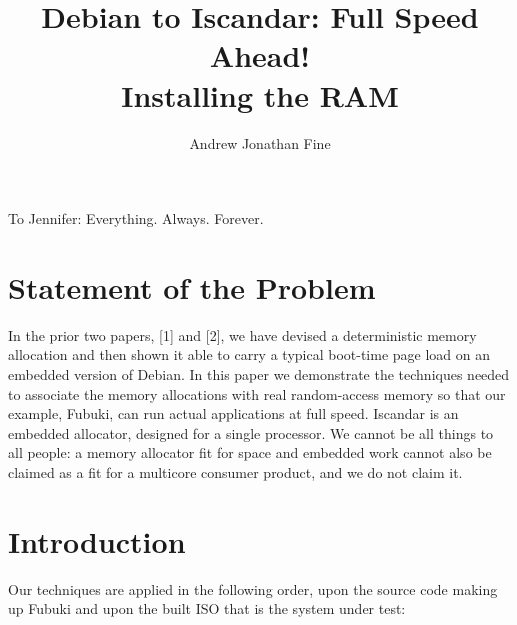 \documentclass[11pt]{article}
\title{Debian to Iscandar: Full Speed Ahead!\\[0.6em] \large Installing the RAM}
\author{Andrew Jonathan Fine}
\date{}
\begin{document}
\maketitle

\thispagestyle{empty}
\newpage

\vspace*{\fill}
\begin{center}
To Jennifer: Everything. Always. Forever.
\end{center}
\vspace*{\fill}

\newpage


\begin{abstract}
\end{abstract}

\section*{Statement of the Problem}
In the prior two papers, [1] and [2], we have devised a deterministic memory allocation and then shown it able to carry a typical boot-time page load on an embedded version of Debian. In this paper we demonstrate the techniques needed to associate the memory allocations with real random-access memory so that our example, Fubuki, can run actual applications at full speed. Iscandar is an embedded allocator, designed for a single processor. We cannot be all things to all people: a memory allocator fit for space and embedded work cannot also be claimed as a fit for a multicore consumer product, and we do not claim it.

\section{Introduction}

Our techniques are applied in the following order, upon the source
code making up Fubuki and upon the built ISO that is the system
under test:
\end{document}
